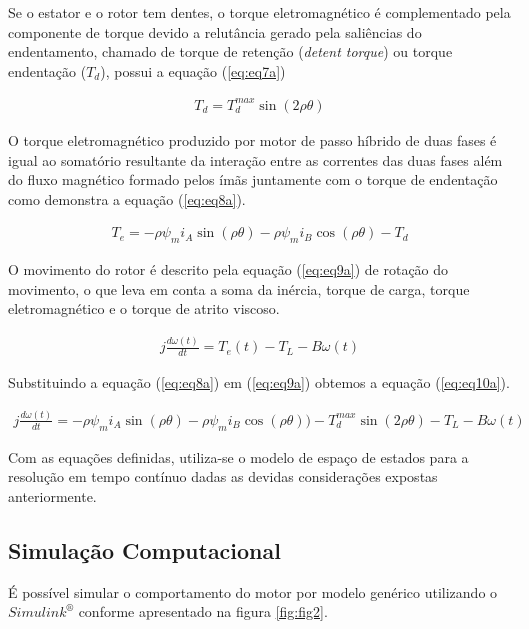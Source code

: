 Se o estator e o rotor tem dentes, o torque eletromagnético é complementado pela componente de torque devido a relutância gerado pela saliências do endentamento, chamado de torque de retenção (\textit{detent torque}) ou torque endentação ($T_d$), possui a equação (\ref{eq:eq7a})

\begin{eqnarray}
\label{eq:eq7a}
T_d = T_{d}^{max}\sin(2 \rho \theta)
\end{eqnarray}

O torque eletromagnético produzido por motor de passo híbrido de duas fases é igual ao somatório resultante da interação entre as correntes das duas fases além do fluxo magnético formado pelos ímãs juntamente com o torque de endentação como demonstra a equação (\ref{eq:eq8a}).

\begin{eqnarray}
	\label{eq:eq8a}
	T_e = - \rho \psi_m i_A \sin(\rho \theta) - \rho \psi_m i_B \cos(\rho \theta ) - T_d
\end{eqnarray}

O movimento do rotor é descrito pela equação (\ref{eq:eq9a}) de rotação do movimento, o que leva em conta a soma da inércia, torque de carga, torque eletromagnético e o torque de atrito viscoso.

\begin{eqnarray}
\label{eq:eq9a}
j\frac{d\omega(t)}{dt} = T_e(t) - T_L - B\omega(t)
\end{eqnarray}

Substituindo a equação (\ref{eq:eq8a}) em (\ref{eq:eq9a}) obtemos a equação (\ref{eq:eq10a}).

\tiny

\begin{eqnarray}
\label{eq:eq10a}
j\frac{d\omega(t)}{dt} = - \rho \psi_m i_A \sin(\rho \theta) - \rho \psi_m i_B \cos(\rho \theta ) )- T_{d}^{max}\sin(2 \rho \theta)  - T_L - B\omega(t)
\end{eqnarray}

\normalsize

Com as equações definidas, utiliza-se o modelo de espaço de estados para a resolução em tempo contínuo dadas as devidas considerações expostas anteriormente. 



\subsection{Simulação Computacional}

É possível simular o comportamento do motor por modelo genérico utilizando o $Simulink^\circledR$ conforme apresentado na figura \ref{fig:fig2}.

